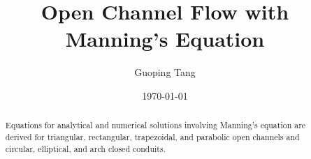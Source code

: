 \documentclass[12pt, a4paper]{article}
\title{Open Channel Flow with Manning's Equation}
\author{Guoping Tang}
\date\today{}
\begin{document}
\maketitle

\begin{abstract}
Equations for analytical and numerical solutions involving Manning's equation are derived for triangular, rectangular, trapezoidal, and parabolic open channels and circular, elliptical, and arch closed conduits.
\end{abstract}












\end{document}
